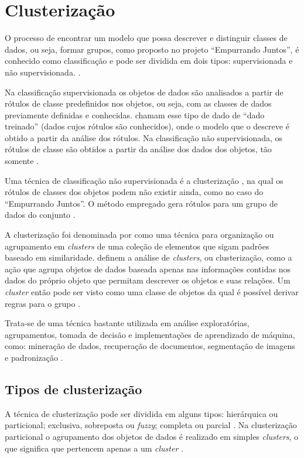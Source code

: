 \chapter{Clusterização} \label{cap:clusterizacao}

O processo de encontrar um modelo que possa descrever e distinguir classes de dados, ou seja, formar 
grupos, como proposto no projeto ``Empurrando Juntos'', é conhecido como classificação e pode
ser dividida em dois tipos: supervisionada e não supervisionada. \cite{tan2013data, han2011data, clustering_review}.

Na classificação supervisionada os objetos de dados são analisados a partir de rótulos de classe predefinidos nos objetos, ou seja, 
com as classes de dados previamente definidas e conhecidas.  chamam esse tipo de dado de ``dado treinado''
(dados cujos rótulos são conhecidos), onde o modelo que o descreve é obtido a partir da análise dos rótulos.
Na classificação não supervisionada, os rótulos de classe são obtidos a partir da análise dos dados dos objetos, tão somente \cite{tan2013data}.

Uma técnica de classificação não supervisionada é a clusterização \cite{clustering_review, tan2013data}, na qual os rótulos de classes dos objetos 
podem não existir ainda, como no caso do ``Empurrando Juntos''. O método empregado gera rótulos para um grupo de dados do conjunto \cite{han2011data}. 

A clusterização foi denominada por  como uma técnica para organização ou agrupamento em \textit{clusters} 
de uma coleção de elementos que sigam padrões baseado em similaridade.
 definem a análise de \textit{clusters}, ou clusterização, como a ação que agrupa objetos de dados
baseada apenas nas informações contidas nos dados do próprio objeto que permitam descrever os objetos e suas relações. Um \textit{cluster}
então pode ser visto como uma classe de objetos da qual é possível derivar regras para o grupo \cite{han2011data}.

Trata-se de uma técnica bastante utilizada em análise exploratórias, agrupamentos, 
tomada de decisão e implementações de aprendizado de máquina, como:
mineração de dados, recuperação de documentos, segmentação de imagens e padronização \cite{clustering_review}.

\section{Tipos de clusterização}
A técnica de clusterização pode ser dividida em alguns tipos: hierárquica ou particional; exclusiva, sobreposta ou \textit{fuzzy}; 
completa ou parcial \cite{tan2013data, clustering_review}. Na clusterização particional o agrupamento dos 
objetos de dados é realizado em simples \textit{clusters}, o que significa que pertencem apenas a um \textit{cluster} \cite{tan2013data}.

